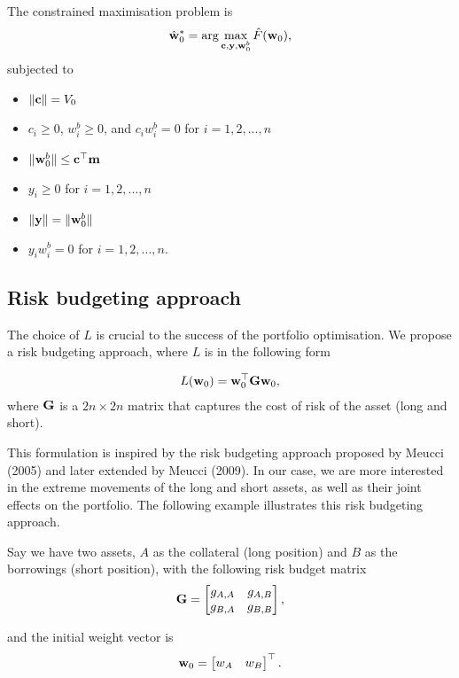 \documentclass{article} %
\theoremstyle{plain}
\theoremstyle{definition} %
\begin{document}
The constrained maximisation problem is 
\begin{align}
\hat {\bf w}^*_0 = \arg\max_{{\bf c}, {\bf y}, {\bf w}^b_0} \hat F({\bf w}_0),
\end{align}
subjected to 
\begin{itemize}
  \item $\|{\bf c}\| = V_0$
  \item $c_i \geq 0$, $w^b_i\geq 0$, and $c_iw^b_i = 0$ for $i=1,2,...,n$
  \item $\|{\bf w}^b_0\| \leq {\bf c}^\top {\bf m}$
  \item $y_i \geq 0$ for $i=1,2,...,n$
  \item $\|{\bf y}\| = \|{\bf w}^b_0\|$
  \item $y_iw^b_i = 0$ for $i=1,2,...,n$.
  \end{itemize}

\subsection{Risk budgeting approach}
The choice of $L$ is crucial to the success of the portfolio optimisation. 
 We propose a risk budgeting approach, where $L$ is in the following form

\begin{align}
  L({\bf w}_0) = {\bf w}_0^\top {\bf G} {\bf w}_0,  
\end{align}
where ${\bf G}$ is a $2n \times 2n$ matrix that captures the cost of risk of the asset (long and short).

This formulation is inspired by the risk budgeting approach proposed by Meucci (2005) and later extended by Meucci (2009).
In our case, we are more interested in the extreme movements of the long and short assets, as well as their joint effects on the portfolio. 
The following example illustrates this risk budgeting approach.

Say we have two assets, $A$ as the collateral (long position) and $B$ as the borrowings (short position), with the following risk budget matrix
\begin{align*}
  {\bf G} = \begin{bmatrix}
    g_{A,A} & g_{A,B} \\
    g_{B,A} & g_{B,B}
  \end{bmatrix}, 
\end{align*}

and the initial weight vector is 
\begin{align*}
  {\bf w}_0 = \begin{bmatrix}
    w_{A} & w_{B}
  \end{bmatrix}^\top.
\end{align*}
\end{document}
